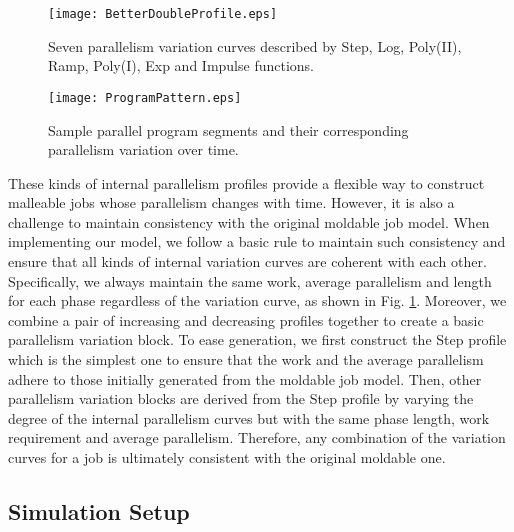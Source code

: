 \documentclass[10pt, a4paper]{article}
\begin{document}
\begin{figure}[t]
\centering
    \texttt{[image: BetterDoubleProfile.eps]}
    \caption{Seven parallelism variation curves described by Step, Log, Poly(II), Ramp, Poly(I), Exp and Impulse functions.}
    \label{fig:profile}
\end{figure}


\begin{figure}[t]
\centering
    \texttt{[image: ProgramPattern.eps]}
    \caption{Sample parallel program segments and their corresponding parallelism variation over time.}
    \label{fig:pattern}
\end{figure}

These kinds of internal parallelism profiles provide a flexible way to construct malleable jobs
whose parallelism changes with time. However, it is also a challenge to maintain consistency with
the original moldable job model. When implementing our model, we follow a basic rule to maintain
such consistency and ensure that all kinds of internal variation curves are coherent with each
other. Specifically, we always maintain the same work, average parallelism and length for each
phase regardless of the variation curve, as shown in Fig. \ref{fig:profile}. Moreover, we combine a
pair of increasing and decreasing profiles together to create a basic parallelism variation block.
To ease generation, we first construct the Step profile which is the simplest one to ensure that
the work and the average parallelism adhere to those initially generated from the moldable job
model. Then, other parallelism variation blocks are derived from the Step profile by varying the
degree of the internal parallelism curves but with the same phase length, work requirement and
average parallelism. Therefore, any combination of the variation curves for a job is ultimately
consistent with the original moldable one.

\subsection{Simulation Setup}
\end{document}
